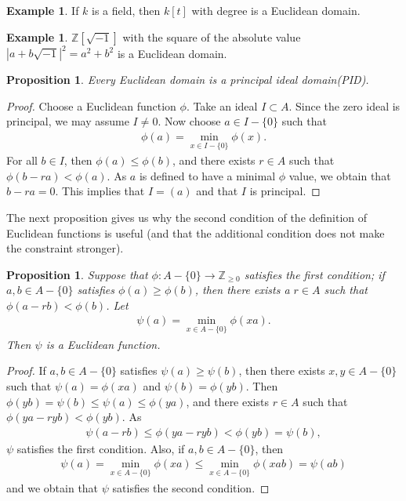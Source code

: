 \documentclass[12pt]{report}
\theoremstyle{plain}
\newtheorem{proposition}[theorem]{Proposition}
\theoremstyle{remark}
\theoremstyle{definition}
\newtheorem{example}[theorem]{Example}
\newcommand{\Z}{\mathbb{Z}}
\begin{document}
\begin{example}\label{Example 2.7.7.}
    If $k$ is a field, then $k[t]$ with degree is a Euclidean domain.
\end{example}

\begin{example}
    $\Z[\sqrt{-1}]$ with the square of the absolute value $|a+b\sqrt{-1}|^2=a^2+b^2$ is a Euclidean domain.
\end{example}

\begin{proposition}\label{Proposition 2.7.9.}
    Every Euclidean domain is a principal ideal domain(PID).
\end{proposition}
\begin{proof}
    Choose a Euclidean function $\phi$. Take an ideal $I\subset A$. Since the zero ideal is principal, we may assume $I\neq 0$. Now choose $a\in I-\{0\}$ such that
    \begin{align*}
        \phi(a) = \min_{x\in I-\{0\}} \phi(x).
    \end{align*}
    For all $b\in I$, then $\phi(a)\le \phi(b)$, and there exists $r\in A$ such that $\phi(b-ra)<\phi(a)$. As $a$ is defined to have a minimal $\phi$ value, we obtain that $b-ra=0$. This implies that $I=(a)$ and that $I$ is principal.
\end{proof}

The next proposition gives us why the second condition of the definition of Euclidean functions is useful (and that the additional condition does not make the constraint stronger).

\begin{proposition}
    Suppose that $\phi:A-\{0\}\rightarrow\Z_{\ge 0}$ satisfies the first condition; if $a,b\in A-\{0\}$ satisfies $\phi(a)\ge \phi(b)$, then there exists a $r\in A$ such that $\phi(a-rb)<\phi(b)$. Let
    \begin{align*}
        \psi(a) = \min_{x\in A-\{0\}} \phi(xa).
    \end{align*}
    Then $\psi$ is a Euclidean function.
\end{proposition}
\begin{proof}
    If $a,b\in A-\{0\}$ satisfies $\psi(a)\ge \psi(b)$, then there exists $x,y\in A-\{0\}$ such that $\psi(a)=\phi(xa)$ and $\psi(b) = \phi(yb)$. Then $\phi(yb) = \psi(b)\le \psi(a)\le \phi(ya)$, and there exists $r\in A$ such that $\phi(ya-ryb) < \phi(yb)$. As
    \begin{align*}
        \psi(a-rb) \le \phi(ya-ryb) < \phi(yb) = \psi(b),
    \end{align*}
    $\psi$ satisfies the first condition. Also, if $a,b\in A-\{0\}$, then
    \begin{align*}
        \psi(a) = \min_{x\in A-\{0\}} \phi(xa) \le \min_{x\in A-\{0\}} \phi(xab) = \psi(ab)
    \end{align*}
    and we obtain that $\psi$ satisfies the second condition.
\end{proof}
\end{document}
